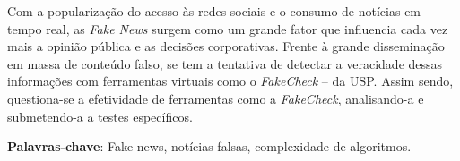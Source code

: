 %
%

\begin{resumo}
	
Com a popularização do acesso às redes sociais e o consumo de notícias em tempo real, as \textit{Fake News} surgem como um grande fator que influencia cada vez mais a opinião pública e as decisões corporativas. Frente à grande disseminação em massa de conteúdo falso, se tem a tentativa de detectar a veracidade dessas informações com ferramentas virtuais como o \textit{FakeCheck} -- da USP. Assim sendo, questiona-se a efetividade de ferramentas como a \textit{FakeCheck}, analisando-a e submetendo-a a testes específicos.
	
\textbf{Palavras-chave}: Fake news, notícias falsas, complexidade de algoritmos.

\end{resumo}
